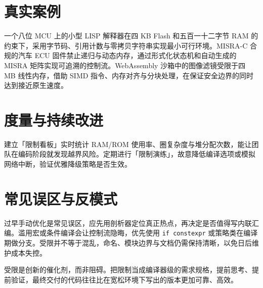 \chapter{真实案例}
一个八位 MCU 上的小型 LISP 解释器在四 KB Flash 和五百一十二字节 RAM 的约束下，采用字节码、引用计数与零拷贝字符串实现最小可行环境。MISRA-C 合规的汽车 ECU 固件禁止递归与动态内存，通过形式化状态机和自动生成的 MISRA 矩阵实现可追溯的控制流。WebAssembly 沙箱中的图像滤镜受限于四 MB 线性内存，借助 SIMD 指令、内存对齐与分块处理，在保证安全边界的同时达到接近原生速度。\par
\chapter{度量与持续改进}
建立「限制看板」实时统计 RAM/ROM 使用率、圈复杂度与堆分配次数，能让团队在编码阶段就发现越界风险。定期进行「限制演练」，故意降低编译选项或模拟网络中断，验证优雅降级策略是否生效。\par
\chapter{常见误区与反模式}
过早手动优化是常见误区，应先用剖析器定位真正热点，再决定是否值得写内联汇编。滥用宏或条件编译会让控制流隐晦，优先使用 \texttt{if constexpr} 或策略类在编译期做分支。受限并不等于混乱，命名、模块边界与文档仍需保持清晰，以免日后维护成本失控。\par
受限是创新的催化剂，而非阻碍。把限制当成编译器级的需求规格，提前思考、提前验证，最终交付的代码往往比在宽松环境下写出的版本更加可靠、高效。\par
